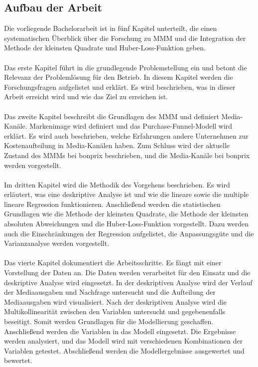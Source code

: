 \subsection{Aufbau der Arbeit}
Die vorliegende Bachelorarbeit ist in fünf Kapitel unterteilt, die einen systematischen Überblick über die Forschung zu \ac{MMM} und die Integration der Methode der kleinsten Quadrate und Huber-Loss-Funktion geben.\\\\
Das erste Kapitel  führt in die grundlegende Problemstellung ein und betont die Relevanz der Problemlösung für den Betrieb. In diesem Kapitel werden die Forschungsfragen aufgelistet und erklärt. Es wird beschrieben, was in dieser Arbeit erreicht wird und wie das Ziel zu erreichen ist. \\\\
Das zweite Kapitel  beschreibt die Grundlagen des \ac{MMM} und definiert Media-Kanäle. Markenimage wird definiert und das Purchase-Funnel-Modell wird erklärt. Es wird auch beschrieben, welche Erfahrungen andere Unternehmen zur Kostenaufteilung in Media-Kanälen haben. Zum Schluss wird der aktuelle Zustand des \ac{MMM}s bei bonprix beschrieben, und die Media-Kanäle bei bonprix werden vorgestellt. \\\\ 
Im dritten Kapitel  wird die Methodik des Vorgehens beschrieben. Es wird erläutert, was eine deskriptive Analyse ist und wie die lineare sowie die multiple lineare Regression funktionieren. Anschließend werden die statistischen Grundlagen wie die Methode der kleinsten Quadrate, die Methode der kleinsten absoluten Abweichungen und die Huber-Loss-Funktion vorgestellt. Dazu werden auch die Einschränkungen der Regression aufgelistet, die Anpassungsgüte und die Varianzanalyse werden vorgestellt.\\\\
Das vierte Kapitel  dokumentiert die Arbeitsschritte. Es fängt mit einer Vorstellung der Daten an. Die Daten werden verarbeitet für den Einsatz und die deskriptive Analyse wird eingesetzt. In der deskriptiven Analyse wird der Verlauf der Mediaausgaben und Nachfrage untersucht und die Aufteilung der Mediaausgaben wird visualisiert. Nach der deskriptiven Analyse wird die Multikollinearität zwischen den Variablen untersucht und gegebenenfalls beseitigt. Somit werden Grundlagen für die Modellierung geschaffen. Anschließend werden die Variablen in das Modell eingesetzt. Die Ergebnisse werden analysiert, und das Modell wird mit verschiedenen Kombinationen der Variablen getestet. Abschließend werden die Modellergebnisse ausgewertet und bewertet.
